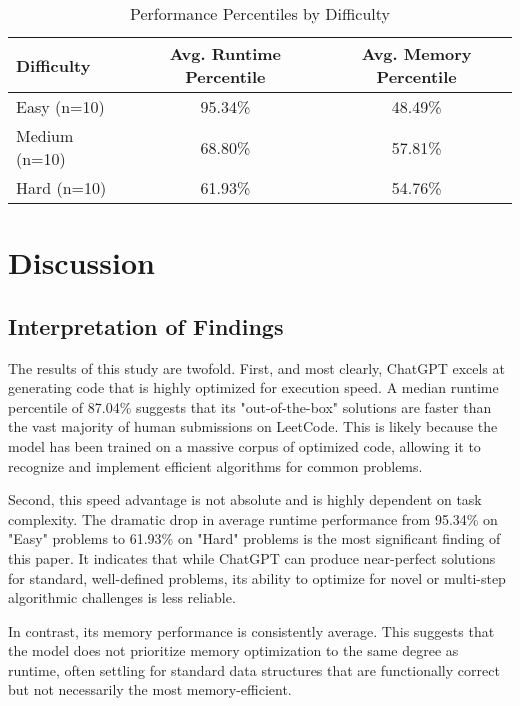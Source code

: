 \documentclass[12pt, a4paper]{article}
\begin{document}
\begin{table}[h!]
\centering
\caption{Performance Percentiles by Difficulty}
\label{tab:difficulty_performance}
\begin{tabular}{@{}lcc@{}}
\toprule
\textbf{Difficulty} & \textbf{Avg. Runtime Percentile} & \textbf{Avg. Memory Percentile} \\ \midrule
Easy (n=10)   & 95.34\%                   & 48.49\%                    \\
Medium (n=10) & 68.80\%                   & 57.81\%                    \\
Hard (n=10)   & 61.93\%                   & 54.76\%                    \\ \bottomrule
\end{tabular}
\end{table}

\section{Discussion}

\subsection{Interpretation of Findings}
The results of this study are twofold. First, and most clearly, ChatGPT excels at generating code that is highly optimized for execution speed. A median runtime percentile of 87.04\% suggests that its "out-of-the-box" solutions are faster than the vast majority of human submissions on LeetCode. This is likely because the model has been trained on a massive corpus of optimized code, allowing it to recognize and implement efficient algorithms for common problems.

Second, this speed advantage is not absolute and is highly dependent on task complexity. The dramatic drop in average runtime performance from 95.34\% on "Easy" problems to 61.93\% on "Hard" problems is the most significant finding of this paper. It indicates that while ChatGPT can produce near-perfect solutions for standard, well-defined problems, its ability to optimize for novel or multi-step algorithmic challenges is less reliable.

In contrast, its memory performance is consistently average. This suggests that the model does not prioritize memory optimization to the same degree as runtime, often settling for standard data structures that are functionally correct but not necessarily the most memory-efficient.
\end{document}
